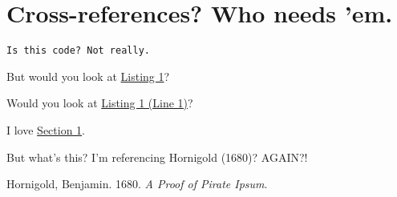 \hypertarget{me}{%
\section{Cross-references? Who needs 'em.}\label{me}}

\hypertarget{snippet}{%
\label{snippet}}%
\begin{verbatim}
Is this code? Not really.
\end{verbatim}

But would you look at \protect\hyperlink{snippet}{Listing 1}?

Would you look at \protect\hyperlink{snippet.1}{Listing 1 (Line 1)}?

I love \protect\hyperlink{me}{Section 1}.

But what's this? I'm referencing Hornigold (1680)? AGAIN?!

\hypertarget{refs}{}
\begin{CSLReferences}{1}{0}
\leavevmode{}%
Hornigold, Benjamin. 1680. \emph{A Proof of Pirate Ipsum}.

\end{CSLReferences}
